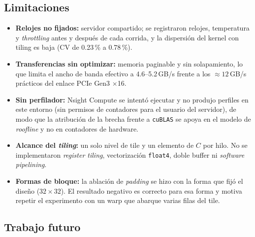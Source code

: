\subsection{Limitaciones}

	\begin{itemize}
		\item \textbf{Relojes no fijados:} servidor compartido; se registraron relojes, temperatura y \textit{throttling} antes y después de cada corrida, y la dispersión del kernel con tiling es baja (CV de 0.23\,\% a 0.78\,\%).
		\item \textbf{Transferencias sin optimizar:} memoria paginable y sin solapamiento, lo que limita el ancho de banda efectivo a 4.6--5.2\,GB/s frente a los $\approx 12$\,GB/s prácticos del enlace PCIe Gen3 $\times$16.
		\item \textbf{Sin perfilador:} Nsight Compute se intentó ejecutar y no produjo perfiles en este entorno (sin permisos de contadores para el usuario del servidor), de modo que la atribución de la brecha frente a \texttt{cuBLAS} se apoya en el modelo de \textit{roofline} y no en contadores de hardware.
		\item \textbf{Alcance del \textit{tiling}:} un solo nivel de tile y un elemento de $C$ por hilo. No se implementaron \textit{register tiling}, vectorización \texttt{float4}, doble buffer ni \textit{software pipelining}.
		\item \textbf{Formas de bloque:} la ablación de \textit{padding} se hizo con la forma que fijó el diseño ($32 \times 32$). El resultado negativo es correcto para esa forma y motiva repetir el experimento con un warp que abarque varias filas del tile.
	\end{itemize}

\subsection{Trabajo futuro}

